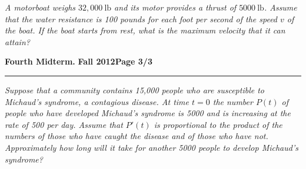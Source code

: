 \documentclass[12pt]{article}
\begin{document}
{\problem[20 pts] \em A motorboat weighs $32,000~\text{lb}$ and its motor provides a thrust of $5000~\text{lb}$.  Assume that the water resistance is 100 pounds for each foot per second of the speed $v$ of the boat.  If the boat starts from rest, what is the maximum velocity that it can attain?}
\vspace{9cm}
\begin{flushright}
\end{flushright}
\newpage
\hfill{\large\bf Fourth Midterm.}\hfill{\large\bf
  Fall 2012}\hfill{\large\bf Page 3/3}\hrule

\bigskip
{\problem[50pts] \em Suppose that a community contains 15,000 people who are susceptible to Michaud's syndrome, a contagious disease.  At time $t=0$ the number $P(t)$ of people who have developed Michaud's syndrome is 5000 and is increasing at the rate of 500 per day.  Assume that $P'(t)$ is proportional to the product of the numbers of those who have caught the disease and of those who have not.  Approximately how long will it take for another 5000 people to develop Michaud's syndrome?}
\vspace{17cm}
\begin{flushright}
\end{flushright}
\end{document}
